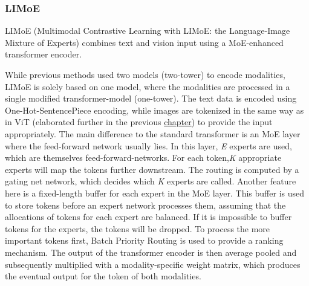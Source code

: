 \documentclass[
]{krantz}
\begin{document}
\hypertarget{limoe}{%
\subsubsection{LIMoE}\label{limoe}}

LIMoE (Multimodal Contrastive Learning with LIMoE: the Language-Image Mixture of Experts) \citep{Mustafa2022} combines text and vision input using a MoE-enhanced transformer encoder.

While previous methods used two models (two-tower) to encode modalities, LIMoE is solely based on one model, where the modalities are processed in a single modified transformer-model (one-tower).
The text data is encoded using One-Hot-SentencePiece \citep{kudo-richardson-2018-sentencepiece} encoding, while images are
tokenized in the same way as in ViT \citep{dosovitskiy2020image} (elaborated further in the previous \protect\hyperlink{c01-02-SOTA-cv}{chapter}) to provide the input appropriately. The main difference to the standard transformer is an MoE layer where the feed-forward network
usually lies. In this layer, \emph{E} experts are used, which are themselves feed-forward-networks. For each token,\emph{K} appropriate experts will map the tokens further downstream. The routing is computed
by a gating net network, which decides which \emph{K} experts are called. Another feature here is a fixed-length buffer for each expert in the MoE layer. This buffer is used to store tokens before an
expert network processes them, assuming that the allocations of tokens for each expert are balanced. If it is impossible to buffer tokens for the experts, the tokens will be dropped. To process the
more important tokens first, Batch Priority Routing \citep{Riquelme2021} is used to provide a ranking mechanism. The output of the transformer encoder is then average pooled and subsequently multiplied with
a modality-specific weight matrix, which produces the eventual output
for the token of both modalities.
\end{document}
